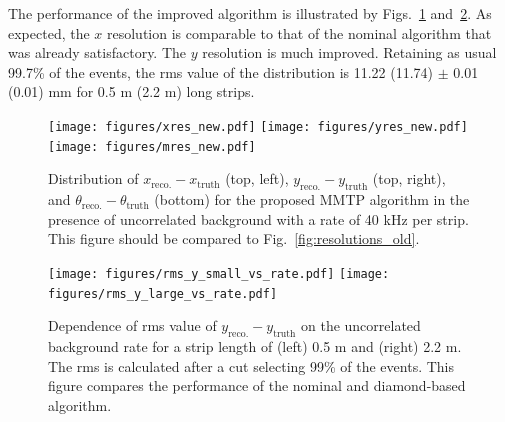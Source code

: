 \par The performance of the improved algorithm is illustrated by Figs.~\ref{fig:resolutions_new} and~\ref{fig:rms_vs_rate}. 
As expected, the $x$ resolution
 is comparable to that of the nominal algorithm that was already satisfactory. The $y$ resolution is much improved. 
Retaining as usual 99.7\% of the events, the rms value of the distribution is 11.22 (11.74) $\pm$ 0.01 (0.01) mm
 for 0.5 m (2.2 m) long strips.
\begin{figure}[!htpb]
  \begin{center}
    \texttt{[image: figures/xres\_new.pdf]}
    \texttt{[image: figures/yres\_new.pdf]}
    \texttt{[image: figures/mres\_new.pdf]}
  \end{center}
  \vspace{-10pt}
  \caption{Distribution of $x_\text{reco.} - x_\text{truth}$ (top, left), $y_\text{reco.} - y_\text{truth}$ (top, right),
 and $\theta_\text{reco.} - \theta_\text{truth}$ (bottom)
 for the proposed MMTP algorithm in the presence of  uncorrelated background with a rate of 40 kHz per strip.
 This figure should be compared to Fig.~\ref{fig:resolutions_old}. }
  \label{fig:resolutions_new}
\end{figure}
\begin{figure}[!htpb]
  \begin{center}
    \texttt{[image: figures/rms\_y\_small\_vs\_rate.pdf]}
    \texttt{[image: figures/rms\_y\_large\_vs\_rate.pdf]}
  \end{center}
  \vspace{-10pt}
  \caption{Dependence of rms value of $y_\text{reco.} - y_\text{truth}$  on
 the uncorrelated background rate for a strip length of (left) 0.5 m  and (right)  2.2 m.
 The rms is calculated  after a cut selecting 99\% of the events. This figure compares the performance of the nominal
and diamond-based algorithm.}
  \label{fig:rms_vs_rate}
\end{figure}
